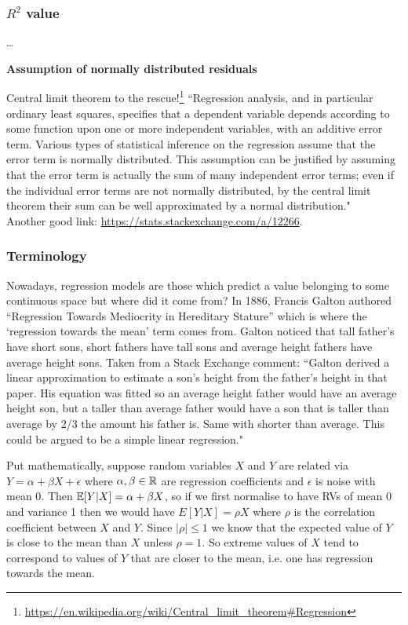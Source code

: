 \documentclass[11pt]{article}
\begin{document}
\subsubsection{$R^2$ value}
\dots

\begin{tcolorbox}[colback=c2]
    \textbf{Assumption of normally distributed residuals}
    \vspace{10pt}

    Central limit theorem to the rescue!\footnote{\url{https://en.wikipedia.org/wiki/Central\_limit\_theorem\#Regression}} ``Regression analysis, and in particular ordinary least squares, specifies that a dependent variable depends according to some function upon one or more independent variables, with an additive error term. Various types of statistical inference on the regression assume that the error term is normally distributed. This assumption can be justified by assuming that the error term is actually the sum of many independent error terms; even if the individual error terms are not normally distributed, by the central limit theorem their sum can be well approximated by a normal distribution."\\

    Another good link: \url{https://stats.stackexchange.com/a/12266}.
\end{tcolorbox}

\subsubsection{Terminology}

Nowadays, regression models are those which predict a value belonging to some continuous space but where did it come from? In 1886, Francis Galton authored ``Regression Towards Mediocrity in Hereditary Stature'' which is where the `regression towards the mean' term comes from. Galton noticed that tall father's have short sons, short fathers have tall sons and average height fathers have average height sons. Taken from a Stack Exchange comment: ``Galton derived a linear approximation to estimate a son's height from the father's height in that paper. His equation was fitted so an average height father would have an average height son, but a taller than average father would have a son that is taller than average by 2/3 the amount his father is. Same with shorter than average. This could be argued to be a simple linear regression."

Put mathematically, suppose random variables $X$ and $Y$ are related via $Y=\alpha+\beta X+\epsilon$ where $\alpha,\beta\in\mathbb{R}$ are regression coefficients and $\epsilon$ is noise with mean $0$. Then $\mathbb{E}[Y|X]=\alpha+\beta X$, so if we first normalise to have RVs of mean 0 and variance 1 then we would have $E[Y|X]=\rho X$ where $\rho$ is the correlation coefficient between $X$ and $Y$. Since $|\rho|\leq1$ we know that the expected value of $Y$ is close to the mean than $X$ unless $\rho=1$. So extreme values of $X$ tend to correspond to values of $Y$ that are closer to the mean, i.e. one has regression towards the mean.
\end{document}
